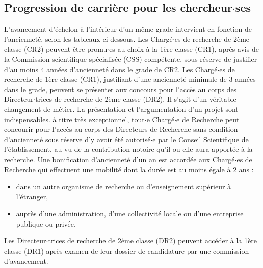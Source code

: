 \subsection{ Progression de carri\`ere pour les chercheur$\cdot$ses}
L'avancement d'\'echelon \`a l'int\'erieur d'un m\^eme grade intervient en fonction de l'anciennet\'e, selon les tableaux ci-dessous. Les Charg\'e$\cdot$es de recherche de 2\`eme classe (CR2) peuvent \^etre promu$\cdot$es au choix \`a la 1\`ere classe (CR1), apr\`es avis de la Commission scientifique sp\'ecialis\'ee (CSS) comp\'etente, sous r\'eserve de justifier d'au
moins 4 ann\'ees d'anciennet\'e dans le grade de CR2. Les Charg\'e$\cdot$es de recherche de 1\`ere classe (CR1), justifiant d'une anciennet\'e minimale de 3 ann\'ees dans le grade, peuvent se pr\'esenter aux concours pour l'acc\`es au corps des Directeur$\cdot$trices de recherche de 2\`eme classe (DR2). Il s'agit d'un v\'eritable changement de m\'etier. La pr\'esentation et l'argumentation d'un projet sont indispensables. \`a titre tr\`es exceptionnel, tout$\cdot$e Charg\'e$\cdot$e de Recherche peut concourir pour l'acc\`es au corps des Directeurs de Recherche sans condition d'anciennet\'e sous r\'eserve d'y avoir \'et\'e autoris\'e$\cdot$e par le Conseil Scientifique de l'\'etablissement, au vu de la contribution notoire qu'il ou elle aura apport\'ee \`a la recherche. Une bonification d'anciennet\'e d'un an est accord\'ee aux Charg\'e$\cdot$es de Recherche qui effectuent une mobilit\'e dont la dur\'ee est au moins \'egale \`a 2 ans :
\begin{itemize}
\item dans un autre organisme de recherche ou d'enseignement sup\'erieur \`a l'\'etranger,
\item aupr\`es d'une administration, d'une collectivit\'e locale ou d'une entreprise publique ou priv\'ee.
\end{itemize}
Les Directeur$\cdot$trices de recherche de 2\`eme classe (DR2) peuvent acc\'eder \`a la 1\`ere classe (DR1) apr\`es examen de leur dossier de candidature par une commission d'avancement.

